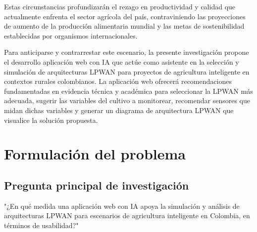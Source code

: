 Estas circunstancias profundizarán el rezago  en  productividad  y  calidad  que
actualmente  enfrenta  el  sector  agrícola   del   país,   contraviniendo   las
proyecciones de aumento de la producción alimentaria  mundial  y  las  metas  de
sostenibilidad establecidas por organismos internacionales.

Para anticiparse y  contrarrestar  este  escenario,  la  presente  investigación
propone el desarrollo aplicación web con IA  que  actúe  como  asistente  en  la
selección y simulación de arquitecturas  LPWAN  para  proyectos  de  agricultura
inteligente  en  contextos  rurales  colombianos.  La  aplicación  web  ofrecerá
recomendaciones fundamentadas en evidencia técnica y académica para  seleccionar
la  LPWAN  más  adecuada,  sugerir  las  variables  del  cultivo  a  monitorear,
recomendar sensores  que  midan  dichas  variables  y  generar  un  diagrama  de
arquitectura LPWAN que visualice la solución propuesta.

\section{Formulación del problema}

\subsection{Pregunta principal de investigación}

"¿En qué medida una aplicación web con IA
apoya la simulación  y  análisis  de  arquitecturas  LPWAN  para  escenarios  de
agricultura inteligente en Colombia, en términos de usabilidad?"